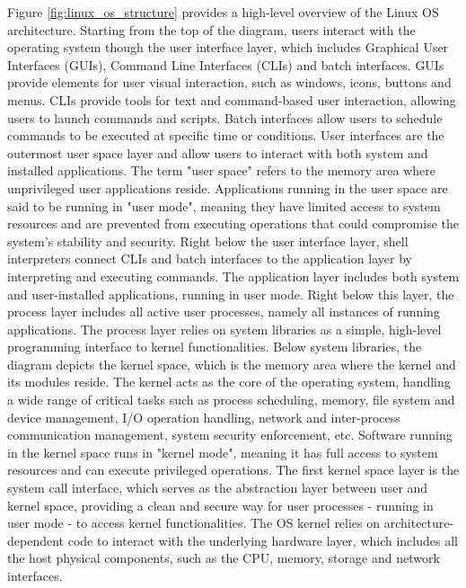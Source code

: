 Figure \ref{fig:linux_os_structure} provides a high-level overview of the Linux OS architecture.
Starting from the top of the diagram, users interact with the operating system though the user interface layer, which includes Graphical User Interfaces (GUIs), Command Line Interfaces (CLIs) and batch interfaces. GUIs provide elements for user visual interaction, such as windows, icons, buttons and menus. CLIs provide tools for text and command-based user interaction, allowing users to launch commands and scripts. Batch interfaces allow users to schedule commands to be executed at specific time or conditions.
User interfaces are the outermost user space layer and allow users to interact with both system and installed applications.
The term "user space" refers to the memory area where unprivileged user applications reside. 
Applications running in the user space are said to be running in "user mode", meaning they have limited access to system resources and are prevented from executing operations that could compromise the system's stability and security. \newline
Right below the user interface layer, shell interpreters connect CLIs and batch interfaces to the application layer by interpreting and executing commands.
The application layer includes both system and user-installed applications, running in user mode. Right below this layer, the process layer includes all active user processes, namely all instances of running applications. 
The process layer relies on system libraries as a simple, high-level programming interface to kernel functionalities. 
Below system libraries, the diagram depicts the kernel space, which is the memory area where the kernel and its modules reside. The kernel acts as the core of the operating system, handling a wide range of critical tasks such as process scheduling, memory, file system and device management, I/O operation handling, network and inter-process communication management, system security enforcement, etc.
Software running in the kernel space runs in "kernel mode", meaning it has full access to system resources and can execute privileged operations.
The first kernel space layer is the system call interface, which serves as the abstraction layer between user and kernel space, providing a clean and secure way for user processes - running in user mode - to access kernel functionalities.
The OS kernel relies on architecture-dependent code to interact with the underlying hardware layer, which includes all the host physical components, such as the CPU, memory, storage and network interfaces.

